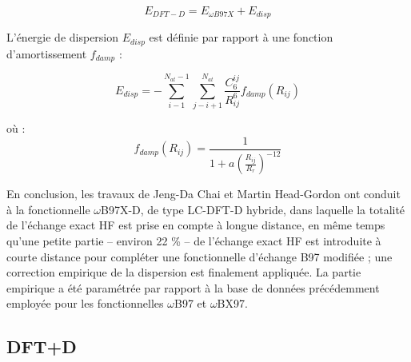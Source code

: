 \documentclass[12pt,a4paper]{book}
\begin{document}
	\begin{equation}
	E_{DFT-D}=E_{\omega B97X}+E_{disp}
	\end{equation}
	
	L'énergie de dispersion $E_{disp}$ est définie par rapport à une fonction d'amortissement $f_{damp}$ :
	
	\begin{equation}
	E_{disp}=-\sum_{i-1}^{N_{at}-1} \sum_{j-i+1}^{N_{at}} \frac{C_{6}^{ij}}{R_{ij}^{6}}f_{damp} (R_{ij})
	\end{equation}
	
	\noindent où :
	\begin{equation}
	f_{damp} (R_{ij})=\frac{1}{1+a(\frac{R_{ij}}{R_{r}})^{-12}}
	\end{equation}
	
	En conclusion, les travaux de Jeng-Da Chai et Martin Head-Gordon ont conduit à la fonctionnelle $\omega$B97X-D, de type LC-DFT-D hybride, dans laquelle la totalité de l'échange exact HF est prise en compte à longue distance, en même temps qu'une petite partie -- environ 22 \% -- de l'échange exact HF est introduite à courte distance pour compléter une fonctionnelle d'échange B97 modifiée ; une correction empirique de la dispersion est finalement appliquée. La partie empirique a été paramétrée par rapport à la base de données précédemment employée pour les fonctionnelles $\omega$B97 et $\omega$BX97.
	
	\subsection{DFT+D}
	
\end{document}

